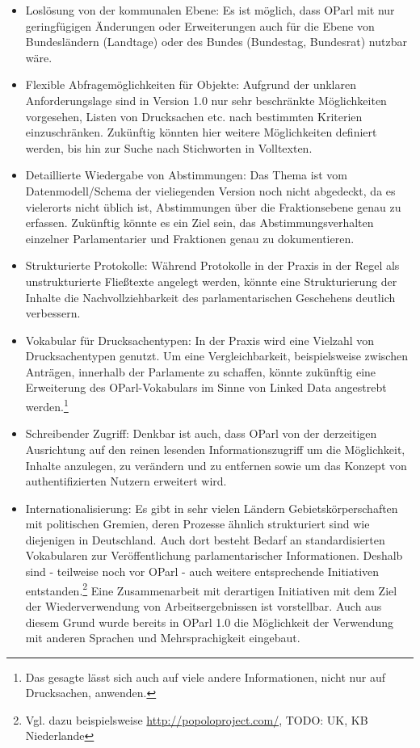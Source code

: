\documentclass[,a4paper]{article}
\begin{document}
\begin{itemize}
\item
  Loslösung von der kommunalen Ebene: Es ist möglich, dass OParl mit nur
  geringfügigen Änderungen oder Erweiterungen auch für die Ebene von
  Bundesländern (Landtage) oder des Bundes (Bundestag, Bundesrat)
  nutzbar wäre.
\item
  Flexible Abfragemöglichkeiten für Objekte: Aufgrund der unklaren
  Anforderungslage sind in Version 1.0 nur sehr beschränkte
  Möglichkeiten vorgesehen, Listen von Drucksachen etc. nach bestimmten
  Kriterien einzuschränken. Zukünftig könnten hier weitere Möglichkeiten
  definiert werden, bis hin zur Suche nach Stichworten in Volltexten.
\item
  Detaillierte Wiedergabe von Abstimmungen: Das Thema ist vom
  Datenmodell/Schema der vieliegenden Version noch nicht abgedeckt, da
  es vielerorts nicht üblich ist, Abstimmungen über die Fraktionsebene
  genau zu erfassen. Zukünftig könnte es ein Ziel sein, das
  Abstimmungsverhalten einzelner Parlamentarier und Fraktionen genau zu
  dokumentieren.
\item
  Strukturierte Protokolle: Während Protokolle in der Praxis in der
  Regel als unstrukturierte Fließtexte angelegt werden, könnte eine
  Strukturierung der Inhalte die Nachvollziehbarkeit des
  parlamentarischen Geschehens deutlich verbessern.
\item
  Vokabular für Drucksachentypen: In der Praxis wird eine Vielzahl von
  Drucksachentypen genutzt. Um eine Vergleichbarkeit, beispielsweise
  zwischen Anträgen, innerhalb der Parlamente zu schaffen, könnte
  zukünftig eine Erweiterung des OParl-Vokabulars im Sinne von Linked
  Data angestrebt werden.\footnote{Das gesagte lässt sich auch auf viele
    andere Informationen, nicht nur auf Drucksachen, anwenden.}
\item
  Schreibender Zugriff: Denkbar ist auch, dass OParl von der derzeitigen
  Ausrichtung auf den reinen lesenden Informationszugriff um die
  Möglichkeit, Inhalte anzulegen, zu verändern und zu entfernen sowie um
  das Konzept von authentifizierten Nutzern erweitert wird.
\item
  Internationalisierung: Es gibt in sehr vielen Ländern
  Gebietskörperschaften mit politischen Gremien, deren Prozesse ähnlich
  strukturiert sind wie diejenigen in Deutschland. Auch dort besteht
  Bedarf an standardisierten Vokabularen zur Veröffentlichung
  parlamentarischer Informationen. Deshalb sind - teilweise noch vor
  OParl - auch weitere entsprechende Initiativen entstanden.\footnote{Vgl.
    dazu beispielsweise \url{http://popoloproject.com/}, TODO: UK, KB
    Niederlande} Eine Zusammenarbeit mit derartigen Initiativen mit dem
  Ziel der Wiederverwendung von Arbeitsergebnissen ist vorstellbar. Auch
  aus diesem Grund wurde bereits in OParl 1.0 die Möglichkeit der
  Verwendung mit anderen Sprachen und Mehrsprachigkeit eingebaut.
\end{itemize}
\end{document}
